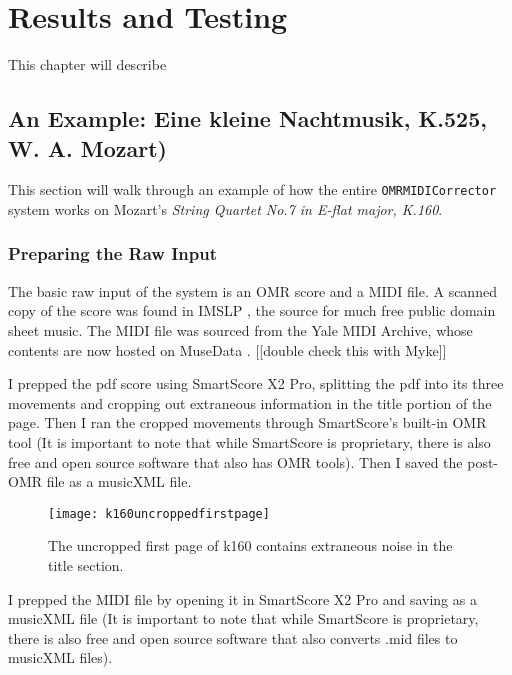 \chapter{Results and Testing}
This chapter will describe 
\section{An Example: Eine kleine Nachtmusik, K.525, W. A. Mozart)}
This section will walk through an example of how the entire \texttt{OMRMIDICorrector} system works on Mozart's \textit{String Quartet No.7 in E-flat major, K.160}.

\subsection{Preparing the Raw Input}
The basic raw input of the system is an OMR score and a MIDI file. A scanned copy of the score was found in IMSLP \cite{k160}, the source for much free public domain sheet music. The MIDI file was sourced from the Yale MIDI Archive\cite{yalemidiarchive}, whose contents are now hosted on MuseData \cite{musedata}. [[double check this with Myke]]

I prepped the pdf score using SmartScore X2 Pro, splitting the pdf into its three movements and cropping out extraneous information in the title portion of the page. Then I ran the cropped movements through SmartScore's built-in OMR tool (It is important to note that while SmartScore is proprietary, there is also free and open source software that also has OMR tools). Then I saved the post-OMR file as a musicXML file. 

\begin{figure}[!ht]
\centering
\texttt{[image: k160uncroppedfirstpage]}
\caption{The uncropped first page of k160 contains extraneous noise in the title section.}
\end{figure}

I prepped the MIDI file by opening it in SmartScore X2 Pro and saving as a musicXML file (It is important to note that while SmartScore is proprietary, there is also free and open source software that also converts .mid files to musicXML files).

